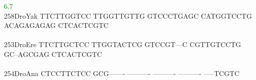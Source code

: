 \documentclass[11pt,twoside,reqno,a4paper]{article}
\begin{document}
{\hspace*{4\charwidth}\hspace*{7\charwidth}\hspace*{1\charwidth}\hspace*{1\charwidth}\hspace*{1\charwidth}\hspace*{1\charwidth}\hspace*{43\charwidth}\textcolor{green}{6.7}\hspace*{1\charwidth}\hspace*{1\charwidth}\\
258\hspace*{1\charwidth}DroYak	TTCTTGGTCC	TTGGTTGTTG	GTCCCTGAGC	CATGGTCCTG	ACAGAGAGAG	CTCACTCGTC	\\
\hspace*{4\charwidth}\hspace*{7\charwidth}\hspace*{1\charwidth}\hspace*{1\charwidth}\hspace*{1\charwidth}\hspace*{1\charwidth}\hspace*{1\charwidth}\hspace*{1\charwidth}\\
253\hspace*{1\charwidth}DroEre	TTCTTGCTCC	TTGGTACTCG	GTCCGT---C	CGTTGTCCTG	GC--AGCGAG	CTCACTCGTC	\\
\hspace*{4\charwidth}\hspace*{7\charwidth}\hspace*{1\charwidth}\hspace*{1\charwidth}\hspace*{1\charwidth}\hspace*{1\charwidth}\hspace*{1\charwidth}\hspace*{1\charwidth}\\
254\hspace*{1\charwidth}DroAna	CTCCTTCTCC	GCG-------	----------	----------	----------	-----TCGTC	\\
\hspace*{4\charwidth}\hspace*{7\charwidth}\hspace*{1\charwidth}\hspace*{1\charwidth}\hspace*{1\charwidth}\hspace*{1\charwidth}\hspace*{1\charwidth}\hspace*{1\charwidth}\\
}
\end{document}
